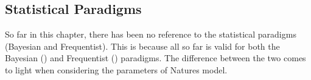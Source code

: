 \subsection{Statistical Paradigms}
So far in this chapter, there has been no reference to the statistical paradigms (Bayesian and Frequentist). This is because all so far is valid for both the Bayesian () and Frequentist () paradigms. The difference between the two comes to light when considering the parameters of Natures model.  